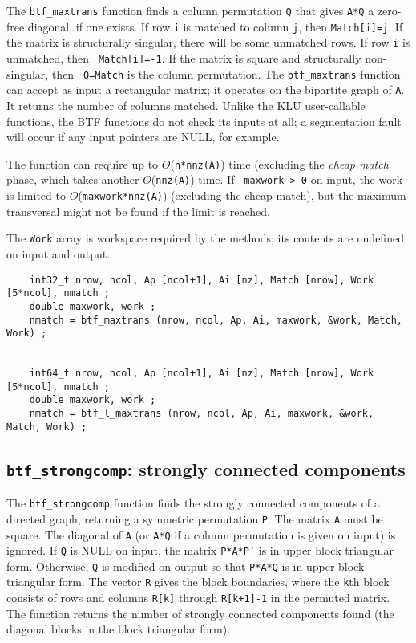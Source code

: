 \documentclass[11pt]{article}
\begin{document}
The {\tt btf\_maxtrans} function finds a column permutation {\tt Q} that gives
{\tt A*Q} a zero-free diagonal, if one exists.  If row {\tt i} is matched to
column {\tt j}, then {\tt Match[i]=j}.  If the matrix is structurally singular,
there will be some unmatched rows.  If row {\tt i} is unmatched, then {\tt
Match[i]=-1}.  If the matrix is square and structurally non-singular, then {\tt
Q=Match} is the column permutation.  The {\tt btf\_maxtrans} function can
accept as input a rectangular matrix; it operates on the bipartite graph of
{\tt A}.  It returns the number of columns matched.  Unlike the KLU
user-callable functions, the BTF functions do not check its inputs at all; a
segmentation fault will occur if any input pointers are NULL, for example.

The function can require up to $O$({\tt n*nnz(A)}) time (excluding the {\em
cheap match} phase, which takes another $O$({\tt nnz(A)}) time.  If {\tt
maxwork > 0} on input, the work is limited to $O$({\tt maxwork*nnz(A)})
(excluding the cheap match), but the maximum transversal might not be found if
the limit is reached.

The {\tt Work} array is workspace required by the methods; its contents
are undefined on input and output.

{\footnotesize
\begin{verbatim}
    int32_t nrow, ncol, Ap [ncol+1], Ai [nz], Match [nrow], Work [5*ncol], nmatch ;
    double maxwork, work ;
    nmatch = btf_maxtrans (nrow, ncol, Ap, Ai, maxwork, &work, Match, Work) ;


    int64_t nrow, ncol, Ap [ncol+1], Ai [nz], Match [nrow], Work [5*ncol], nmatch ;
    double maxwork, work ;
    nmatch = btf_l_maxtrans (nrow, ncol, Ap, Ai, maxwork, &work, Match, Work) ;
\end{verbatim}
}

\subsection{{\tt btf\_strongcomp}: strongly connected components}

The {\tt btf\_strongcomp} function finds the strongly connected components of a
directed graph, returning a symmetric permutation {\tt P}.  The matrix {\tt A}
must be square.  The diagonal of {\tt A} (or {\tt A*Q} if a column permutation
is given on input) is ignored.  If {\tt Q} is NULL on input, the matrix
{\tt P*A*P'} is in upper block triangular form.  Otherwise, {\tt Q} is modified
on output so that {\tt P*A*Q} is in upper block triangular form.  The vector
{\tt R} gives the block boundaries, where the {\tt k}th block consists of
rows and columns {\tt R[k]} through {\tt R[k+1]-1} in the permuted matrix.
The function returns the number of strongly connected components found
(the diagonal blocks in the block triangular form).
\end{document}
